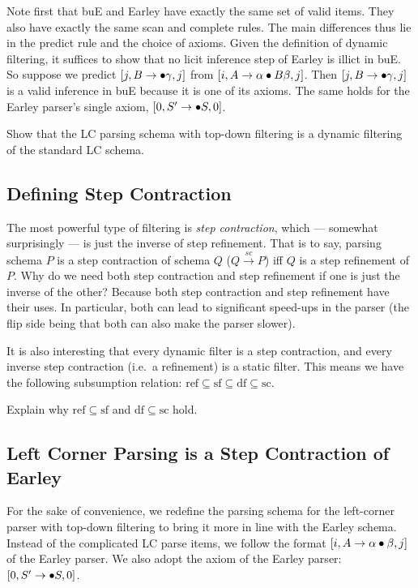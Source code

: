 Note first that buE and Earley have exactly the same set of valid items.
They also have exactly the same scan and complete rules.
The main differences thus lie in the predict rule and the choice of axioms.
Given the definition of dynamic filtering, it suffices to show that no licit inference step of Earley is illict in buE\@.
So suppose we predict $[j, B \rightarrow \bullet \gamma, j]$ from $[i, A \rightarrow \alpha \bullet B \beta, j]$.
Then $[j, B \rightarrow \bullet \gamma, j]$ is a valid inference in buE because it is one of its axioms.
The same holds for the Earley parser's single axiom, $[0, S' \rightarrow \bullet S, 0]$.
%
\begin{exercise}
    Show that the LC parsing schema with top-down filtering is a dynamic filtering of the standard LC schema.
\end{exercise}

\subsection{Defining Step Contraction}

The most powerful type of filtering is \emph{step contraction}, which --- somewhat surprisingly --- is just the inverse of step refinement.
That is to say, parsing schema $P$ is a step contraction of schema $Q$ ($Q \xrightarrow{\mathit{sc}} P$) iff $Q$ is a step refinement of $P$.
Why do we need both step contraction and step refinement if one is just the inverse of the other?
Because both step contraction and step refinement have their uses.
In particular, both can lead to significant speed-ups in the parser (the flip side being that both can also make the parser slower).

It is also interesting that every dynamic filter is a step contraction, and every inverse step contraction (i.e.\ a refinement) is a static filter.
This means we have the following subsumption relation: $\mathrm{ref} \subseteq \mathrm{sf} \subseteq \mathrm{df} \subseteq \mathrm{sc}$.
%
\begin{exercise}
    Explain why $\mathrm{ref} \subseteq \mathrm{sf}$ and $\mathrm{df} \subseteq \mathrm{sc}$ hold.
\end{exercise}

\subsection{Left Corner Parsing is a Step Contraction of Earley}

For the sake of convenience, we redefine the parsing schema for the left-corner parser with top-down filtering to bring it more in line with the Earley schema.
Instead of the complicated LC parse items, we follow the format $[i, A \rightarrow \alpha \bullet \beta, j]$ of the Earley parser.
We also adopt the axiom of the Earley parser: $[0, S' \rightarrow \bullet S, 0]$.

